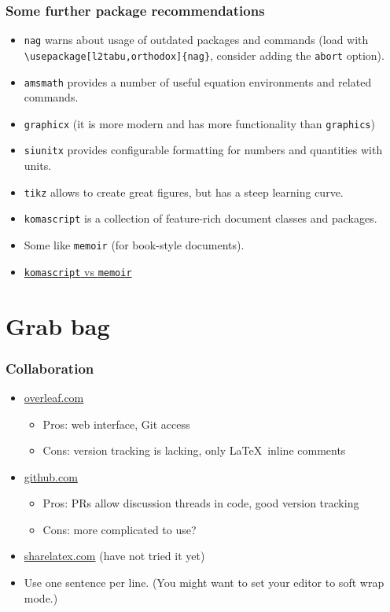 \documentclass[aspectratio=1610,hyperref={colorlinks,linkcolor=}]{beamer}
\begin{document}
\begin{frame}[fragile]
    \frametitle{Some further package recommendations}
    \begin{itemize}
        \item \verb+nag+ warns about usage of outdated packages and commands (load with \verb$\usepackage[l2tabu,orthodox]{nag}$, consider adding the \verb+abort+ option).
        \item \verb+amsmath+ provides a number of useful equation environments and related commands.
        \item \verb+graphicx+ (it is more modern and has more functionality than \verb+graphics+)
        \item \verb+siunitx+ provides configurable formatting for numbers and quantities with units.
        \item \verb+tikz+ allows to create great figures, but has a steep learning curve.
        \item \verb+komascript+ is a collection of feature-rich document classes and packages.
        \item Some like \verb+memoir+ (for book-style documents).
        \item \href{http://tex.stackexchange.com/questions/7742/what-are-the-strengths-and-weaknesses-of-koma-script-and-memoir}{\texttt{komascript} vs \texttt{memoir}}
    \end{itemize}
\end{frame}

\section{Grab bag}
\begin{frame}
    \frametitle{Collaboration}
    \begin{itemize}
        \item \url{overleaf.com}
            \begin{itemize}
                \item Pros: web interface, Git access
                \item Cons: version tracking is lacking, only \LaTeX\ inline comments
            \end{itemize}
        \item \url{github.com}
            \begin{itemize}
                \item Pros: PRs allow discussion threads in code, good version tracking
                \item Cons: more complicated to use?
            \end{itemize}
        \item \url{sharelatex.com} (have not tried it yet)
        \item Use one sentence per line. (You might want to set your editor to soft wrap mode.)
    \end{itemize}
\end{frame}
\end{document}
